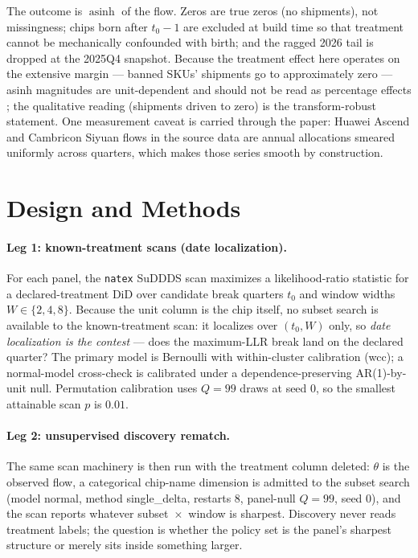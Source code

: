 \documentclass[11pt]{article}
\newcommand{\natex}{\texttt{natex}}
\begin{document}
The outcome is $\operatorname{asinh}$ of the flow. Zeros are true zeros (no
shipments), not missingness; chips born after $t_0-1$ are excluded at build
time so that treatment cannot be mechanically confounded with birth; and the
ragged 2026 tail is dropped at the 2025Q4 snapshot. Because the treatment
effect here operates on the extensive margin --- banned SKUs' shipments go to
approximately zero --- asinh magnitudes are unit-dependent and should not be
read as percentage effects \cite{chenroth2024}; the qualitative reading
(shipments driven to zero) is the transform-robust statement. One
measurement caveat is carried through the paper: Huawei Ascend and Cambricon
Siyuan flows in the source data are annual allocations smeared uniformly
across quarters, which makes those series smooth by construction.

\section{Design and Methods}\label{sec:methods}

\paragraph{Leg 1: known-treatment scans (date localization).} For each panel,
the \natex{} SuDDDS scan \cite{natex,herlands2018} maximizes a
likelihood-ratio statistic for a declared-treatment DiD over candidate break
quarters $t_0$ and window widths $W\in\{2,4,8\}$. Because the unit column is
the chip itself, no subset search is available to the known-treatment scan:
it localizes over $(t_0,W)$ only, so \emph{date localization is the contest}
--- does the maximum-LLR break land on the declared quarter? The primary
model is Bernoulli with within-cluster calibration (wcc); a normal-model
cross-check is calibrated under a dependence-preserving AR(1)-by-unit null.
Permutation calibration uses $Q=99$ draws at seed 0, so the smallest
attainable scan $p$ is $0.01$.

\paragraph{Leg 2: unsupervised discovery rematch.} The same scan machinery is
then run with the treatment column deleted: $\theta$ is the observed flow, a
categorical chip-name dimension is admitted to the subset search (model
normal, method single\_delta, restarts 8, panel-null $Q=99$, seed 0), and the
scan reports whatever subset~$\times$~window is sharpest. Discovery never
reads treatment labels; the question is whether the policy set is the
panel's sharpest structure or merely sits inside something larger.
\end{document}
